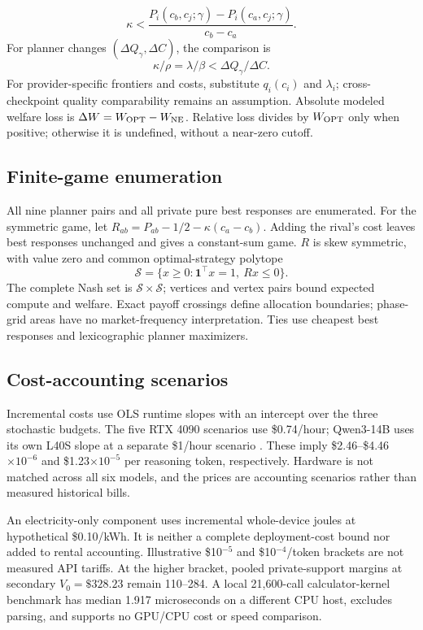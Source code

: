 \documentclass[sigconf,anonymous,nonacm]{acmart}
\begin{document}
\begin{equation}
\kappa<\frac{P_i(c_b,c_j;\gamma)-P_i(c_a,c_j;\gamma)}{c_b-c_a}.
\label{eq:privatethreshold}\end{equation}
For planner changes $(\Delta Q_\gamma,\Delta C)$, the comparison is
\begin{equation}
\kappa/\rho=\lambda/\beta<\Delta Q_\gamma/\Delta C.
\label{eq:plannerthreshold}\end{equation}
For provider-specific frontiers and costs, substitute $q_i(c_i)$ and $\lambda_i$; cross-checkpoint quality comparability remains an assumption. Absolute modeled welfare loss is $\Delta W=W_{\rm OPT}-W_{\rm NE}$. Relative loss divides by $W_{\rm OPT}$ only when positive; otherwise it is undefined, without a near-zero cutoff.
\subsection{Finite-game enumeration}
All nine planner pairs and all private pure best responses are enumerated. For the symmetric game, let $R_{ab}=P_{ab}-1/2-\kappa(c_a-c_b)$. Adding the rival's cost leaves best responses unchanged and gives a constant-sum game. $R$ is skew symmetric, with value zero and common optimal-strategy polytope
\begin{equation}
\mathcal S=\{x\geq0:\mathbf1^\top x=1,\ Rx\leq0\}.
\label{eq:equilibriumpolytope}\end{equation}
The complete Nash set is $\mathcal S\times\mathcal S$; vertices and vertex pairs bound expected compute and welfare. Exact payoff crossings define allocation boundaries; phase-grid areas have no market-frequency interpretation. Ties use cheapest best responses and lexicographic planner maximizers.
\subsection{Cost-accounting scenarios}
Incremental costs use OLS runtime slopes with an intercept over the three stochastic budgets. The five RTX 4090 scenarios use \$0.74/hour; Qwen3-14B uses its own L40S slope at a separate \$1/hour scenario \citep{runpod2026pricing}. These imply \$2.46--\$4.46$\times10^{-6}$ and \$1.23$\times10^{-5}$ per reasoning token, respectively. Hardware is not matched across all six models, and the prices are accounting scenarios rather than measured historical bills.

An electricity-only component uses incremental whole-device joules at hypothetical \$0.10/kWh. It is neither a complete deployment-cost bound nor added to rental accounting. Illustrative \$10$^{-5}$ and \$10$^{-4}$/token brackets are not measured API tariffs. At the higher bracket, pooled private-support margins at secondary $V_0=\$328.23$ remain 110--284. A local 21,600-call calculator-kernel benchmark has median 1.917 microseconds on a different CPU host, excludes parsing, and supports no GPU/CPU cost or speed comparison.
\end{document}
